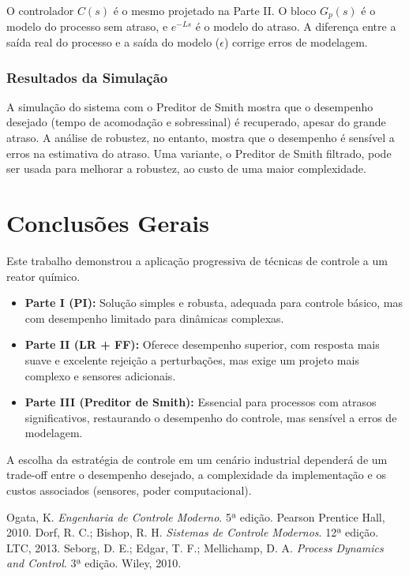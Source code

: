 \documentclass[a4paper,12pt]{report}
\begin{document}
O controlador \(C(s)\) é o mesmo projetado na Parte II. O bloco \(G_p(s)\) é o modelo do processo sem atraso, e \(e^{-Ls}\) é o modelo do atraso. A diferença entre a saída real do processo e a saída do modelo (\(\epsilon\)) corrige erros de modelagem.

\subsection{Resultados da Simulação}
A simulação do sistema com o Preditor de Smith mostra que o desempenho desejado (tempo de acomodação e sobressinal) é recuperado, apesar do grande atraso. A análise de robustez, no entanto, mostra que o desempenho é sensível a erros na estimativa do atraso. Uma variante, o Preditor de Smith filtrado, pode ser usada para melhorar a robustez, ao custo de uma maior complexidade.

\chapter{Conclusões Gerais}
Este trabalho demonstrou a aplicação progressiva de técnicas de controle a um reator químico.
\begin{itemize}
    \item \textbf{Parte I (PI):} Solução simples e robusta, adequada para controle básico, mas com desempenho limitado para dinâmicas complexas.
    \item \textbf{Parte II (LR + FF):} Oferece desempenho superior, com resposta mais suave e excelente rejeição a perturbações, mas exige um projeto mais complexo e sensores adicionais.
    \item \textbf{Parte III (Preditor de Smith):} Essencial para processos com atrasos significativos, restaurando o desempenho do controle, mas sensível a erros de modelagem.
\end{itemize}
A escolha da estratégia de controle em um cenário industrial dependerá de um trade-off entre o desempenho desejado, a complexidade da implementação e os custos associados (sensores, poder computacional).

\begin{thebibliography}{9}
     Ogata, K. \textit{Engenharia de Controle Moderno}. 5ª edição. Pearson Prentice Hall, 2010.
     Dorf, R. C.; Bishop, R. H. \textit{Sistemas de Controle Modernos}. 12ª edição. LTC, 2013.
     Seborg, D. E.; Edgar, T. F.; Mellichamp, D. A. \textit{Process Dynamics and Control}. 3ª edição. Wiley, 2010.
\end{thebibliography}
\end{document}
